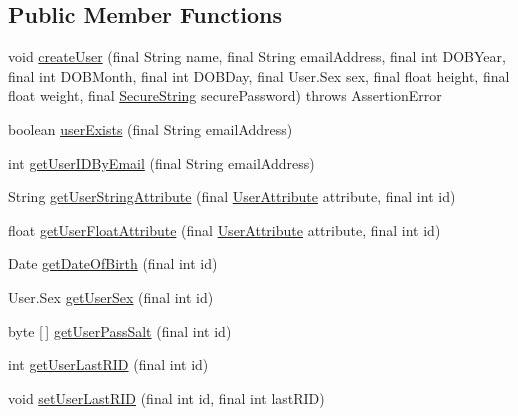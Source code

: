 \subsection*{Public Member Functions}
\begin{DoxyCompactItemize}
\item 
void \mbox{\hyperlink{classcom_1_1activitytracker_1_1_d_b_manager_a39ef296348c7bfacf965b3417655f4e5}{create\+User}} (final String name, final String email\+Address, final int D\+O\+B\+Year, final int D\+O\+B\+Month, final int D\+O\+B\+Day, final User.\+Sex sex, final float height, final float weight, final \mbox{\hyperlink{classcom_1_1activitytracker_1_1_secure_string}{Secure\+String}} secure\+Password)  throws Assertion\+Error 
\item 
boolean \mbox{\hyperlink{classcom_1_1activitytracker_1_1_d_b_manager_af05d79f33ecf2920a67d1b9cf82c079f}{user\+Exists}} (final String email\+Address)
\item 
int \mbox{\hyperlink{classcom_1_1activitytracker_1_1_d_b_manager_a195dcdeabdd00facb19d720976dd3f53}{get\+User\+I\+D\+By\+Email}} (final String email\+Address)
\item 
String \mbox{\hyperlink{classcom_1_1activitytracker_1_1_d_b_manager_a20f726c054d6c8a6fc3ce629d87f1114}{get\+User\+String\+Attribute}} (final \mbox{\hyperlink{enumcom_1_1activitytracker_1_1_user_attribute}{User\+Attribute}} attribute, final int id)
\item 
float \mbox{\hyperlink{classcom_1_1activitytracker_1_1_d_b_manager_a98df66254bec4d74b29cfe468a9fc794}{get\+User\+Float\+Attribute}} (final \mbox{\hyperlink{enumcom_1_1activitytracker_1_1_user_attribute}{User\+Attribute}} attribute, final int id)
\item 
Date \mbox{\hyperlink{classcom_1_1activitytracker_1_1_d_b_manager_a0576baf67b45c7d2d0ba369052e4404e}{get\+Date\+Of\+Birth}} (final int id)
\item 
User.\+Sex \mbox{\hyperlink{classcom_1_1activitytracker_1_1_d_b_manager_a4e695c111b877cfd1d918602551f65a1}{get\+User\+Sex}} (final int id)
\item 
byte \mbox{[}$\,$\mbox{]} \mbox{\hyperlink{classcom_1_1activitytracker_1_1_d_b_manager_aeab864b072cc08c0521e80ae1f459ca7}{get\+User\+Pass\+Salt}} (final int id)
\item 
int \mbox{\hyperlink{classcom_1_1activitytracker_1_1_d_b_manager_aab14c61b3f3a17bdea10cab1b5fd9337}{get\+User\+Last\+R\+ID}} (final int id)
\item 
void \mbox{\hyperlink{classcom_1_1activitytracker_1_1_d_b_manager_a93b7fc4c2d0083e125852d84f087a8d3}{set\+User\+Last\+R\+ID}} (final int id, final int last\+R\+ID)

\end{DoxyCompactItemize}
